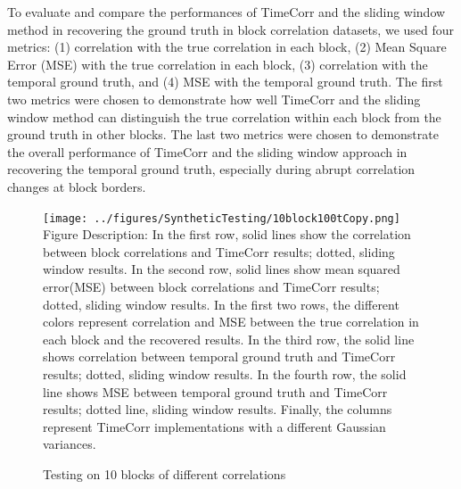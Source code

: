 \documentclass[11pt]{article}
\begin{document}
To evaluate and compare the performances of TimeCorr and the sliding window method in recovering the ground truth in block correlation datasets, we used four metrics: (1) correlation with the true correlation in each block, (2) Mean Square Error (MSE) with the true correlation in each block, (3) correlation with the temporal ground truth, and (4) MSE with the temporal ground truth. The first two metrics were chosen to demonstrate how well TimeCorr and the sliding window method can distinguish the true correlation within each block from the ground truth in other blocks. The last two metrics were chosen to demonstrate the overall performance of TimeCorr and the sliding window approach in recovering the temporal ground truth, especially during abrupt correlation changes at block borders.

\begin{figure}[!htb]
\caption{Testing on 10 blocks of different correlations}
\texttt{[image: ../figures/SyntheticTesting/10block100tCopy.png]}
\label{fig:10block100t}
Figure Description: In the first row, solid lines show the correlation between block correlations and TimeCorr results; dotted, sliding window results. In the second row, solid lines show mean squared error(MSE) between block correlations and TimeCorr results; dotted, sliding window results. In the first two rows, the different colors represent correlation and MSE between the true correlation in each block and the recovered results. In the third row, the solid line shows correlation between temporal ground truth and TimeCorr results; dotted, sliding window results. In the fourth row, the solid line shows MSE between temporal ground truth and TimeCorr results; dotted line, sliding window results. Finally, the columns represent TimeCorr implementations with a different Gaussian variances.
\end{figure}
\end{document}

